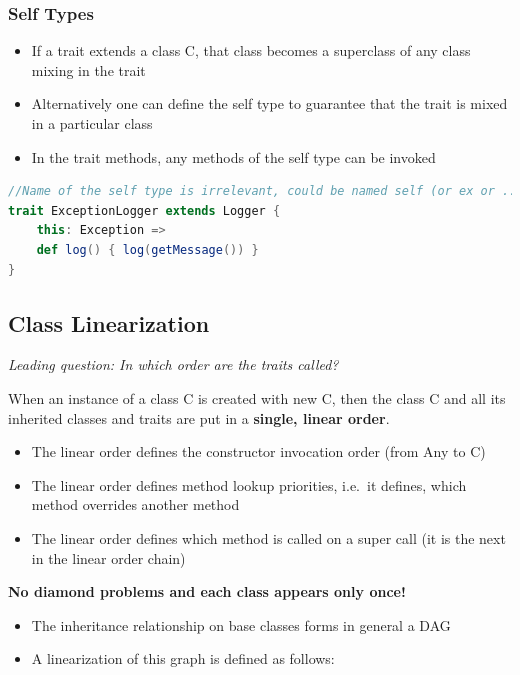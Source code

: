 \clearpage
\hypertarget{self-types}{%
\subsubsection{Self Types}\label{self-types}}

\begin{itemize}
\tightlist
\item
  If a trait extends a class C, that class becomes a superclass of any
  class mixing in the trait
\item
  Alternatively one can define the self type to guarantee that the trait
  is mixed in a particular class
\item
  In the trait methods, any methods of the self type can be invoked
\end{itemize}

\begin{lstlisting}[language=scala,mathescape=false]
//Name of the self type is irrelevant, could be named self (or ex or ...)
trait ExceptionLogger extends Logger {
    this: Exception =>
    def log() { log(getMessage()) }
}
\end{lstlisting}

\hypertarget{class-linearization}{%
\subsection{Class Linearization}\label{class-linearization}}

\textit{Leading question: In which order are the traits called?}

When an instance of a class C is created with new C, then the class C
and all its inherited classes and traits are put in a \textbf{single,
linear order}.

\begin{itemize}
\tightlist
\item
  The linear order defines the constructor invocation order (from Any to
  C)
\item
  The linear order defines method lookup priorities, i.e.~it defines,
  which method overrides another method
\item
  The linear order defines which method is called on a super call (it is
  the next in the linear order chain)
\end{itemize}

\textbf{No diamond problems and each class appears only once!}

\begin{itemize}
\tightlist
\item
  The inheritance relationship on base classes forms in general a DAG
\item
  A linearization of this graph is defined as follows:
\end{itemize}

